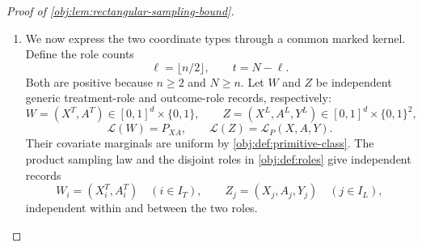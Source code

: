 \begin{proof}[Proof of \cref{obj:lem:rectangular-sampling-bound}]
\begin{enumerate}
For completeness, the same factors give an explicit row-integral bound for the fine kernel. Set
\[
\delta=\frac hJ,\qquad
\mathcal Z_J=\{0,\ldots,J-1\}^d,\qquad
x_{\mathrm{cell},\mathbf z,i}
=\frac12-\frac h2+\left(z_i+\frac12\right)\delta
\quad(\mathbf z\in\mathcal Z_J).
\]
Let \(C_{\mathrm{cell},\mathbf z}\) be the product of the intervals
\[
\left[\frac12-\frac h2+z_i\delta,\,
      \frac12-\frac h2+(z_i+1)\delta\right),
\]
with the right endpoint included when \(z_i=J-1\). Thus these cells partition \(C_h\).
The fine basis coordinates of \cref{obj:def:projection} are
\[
b_{\mathbf z,u}(x)
=\sqrt{J^d}\,\mathbf1_{C_{\mathrm{cell},\mathbf z}}(x)
 \prod_{i=1}^d
 p_{\mathrm{ref},u_i}
 \left(\frac{x_i-x_{\mathrm{cell},\mathbf z,i}}{\delta}\right),
\qquad
x\in\mathbb R^d,\quad
(\mathbf z,u)\in\mathcal Z_J\times\mathcal U_d.
\]
In particular, their values are zero outside their supporting cells, and
\[
|b_{\mathbf z,u}(x)|\le\sqrt{J^d}\,4^d.
\]
With \(\boldsymbol0=(0,\ldots,0)\), the constant coordinate satisfies
\[
b_{\mathbf z,\boldsymbol0}(x)
=\sqrt{J^d}\,\mathbf1_{C_{\mathrm{cell},\mathbf z}}(x),
\qquad
\int b_{\mathbf z,\boldsymbol0}(x)^2\,d\nu_h(x)=1,
\]
where the last identity is its orthonormal normalization. Pointwise,
\[
|b_{\mathbf z,u}(x)|
\le \frac{4^d}{\sqrt{J^d}}\,
      b_{\mathbf z,\boldsymbol0}(x)^2,
\]
so integration yields
\[
\int |b_{\mathbf z,u}(x)|\,d\nu_h(x)
\le\frac{4^d}{\sqrt{J^d}}.
\]
If \(x\in C_{\mathrm{cell},\mathbf z}\), only that cell contributes to the kernel, and hence
\[
K_J(x,x')
=\sum_{u\in\mathcal U_d}
 b_{\mathbf z,u}(x)b_{\mathbf z,u}(x').
\]
It follows that
\[
\begin{aligned}
\int |K_J(x,x')|\,d\nu_h(x')
&\le\sum_{u\in\mathcal U_d}
 |b_{\mathbf z,u}(x)|
 \int |b_{\mathbf z,u}(x')|\,d\nu_h(x')\\
&\le q\bigl(\sqrt{J^d}\,4^d\bigr)
          \frac{4^d}{\sqrt{J^d}}
=D_d.
\end{aligned}
\]
If \(x\) belongs to no fine cell, every fine basis coordinate at \(x\) is zero, and the same bound holds. Thus
\[
\int |K_J(x,x')|\,d\nu_h(x')\le D_d
\qquad(x\in\mathbb R^d).
\]
The basis-product formula also gives
\[
K_J(x,x')=K_J(x',x).
\]

\item We now express the two coordinate types through a common marked kernel. Define the role counts
\[
\ell=\lfloor n/2\rfloor,\qquad t=N-\ell.
\]
Both are positive because \(n\ge2\) and \(N\ge n\). Let \(W\) and \(Z\) be independent generic treatment-role and outcome-role records, respectively:
\[
W=(X^T,A^T)\in[0,1]^d\times\{0,1\},
\qquad
Z=(X^L,A^L,Y^L)\in[0,1]^d\times\{0,1\}^2,
\]
\[
\mathcal L(W)=P_{XA},
\qquad
\mathcal L(Z)=\mathcal L_P(X,A,Y).
\]
Their covariate marginals are uniform by \cref{obj:def:primitive-class}. The product sampling law and the disjoint roles in \cref{obj:def:roles} give independent records
\[
W_i=(X_i^T,A_i^T)\quad(i\in I_T),
\qquad
Z_j=(X_j,A_j,Y_j)\quad(j\in I_L),
\]
independent within and between the two roles.


\end{enumerate}
\end{proof}
